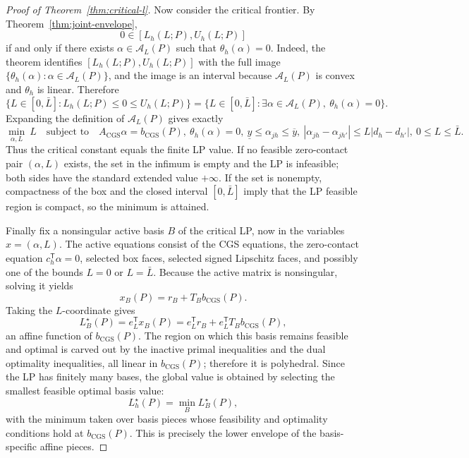 \documentclass[11pt]{article}
\newcommand{\transpose}{\mathsf{T}}
\theoremstyle{definition}
\theoremstyle{plain}
\theoremstyle{remark}
\begin{document}
\begin{proof}[Proof of Theorem~\ref{thm:critical-l}]
Now consider the critical frontier.  By Theorem~\ref{thm:joint-envelope},
\[
  0\in[L_h(L;P),U_h(L;P)]
\]
if and only if there exists \(\alpha\in\mathcal A_L(P)\) such that
\(\theta_h(\alpha)=0\).  Indeed, the theorem identifies
\([L_h(L;P),U_h(L;P)]\) with the full image
\(\{\theta_h(\alpha):\alpha\in\mathcal A_L(P)\}\), and the image is an
interval because \(\mathcal A_L(P)\) is convex and \(\theta_h\) is linear.
Therefore
\[
  \{L\in[0,\bar L]:L_h(L;P)\le0\le U_h(L;P)\}
  =
  \{L\in[0,\bar L]:\exists\alpha\in\mathcal A_L(P),\
    \theta_h(\alpha)=0\}.
\]
Expanding the definition of \(\mathcal A_L(P)\) gives exactly
\[
 \min_{\alpha,L}\ L
 \quad\text{subject to}\quad
 A_{\mathrm{CGS}}\alpha=b_{\mathrm{CGS}}(P),\ 
 \theta_h(\alpha)=0,\ 
 \underline y\le\alpha_{jh}\le\overline y,\ 
 |\alpha_{j h}-\alpha_{j h'}|\le L|d_h-d_{h'}|,\ 
 0\le L\le\bar L .
\]
Thus the critical constant equals the finite LP value.  If no feasible
zero-contact pair \((\alpha,L)\) exists, the set in the infimum is empty and
the LP is infeasible; both sides have the standard extended value \(+\infty\).
If the set is nonempty, compactness of the box and the closed interval
\([0,\bar L]\) imply that the LP feasible region is compact, so the minimum is
attained.

Finally fix a nonsingular active basis \(B\) of the critical LP, now in the
variables \(x=(\alpha,L)\).  The active equations consist of the CGS equations,
the zero-contact equation \(c_h^\transpose\alpha=0\), selected box faces,
selected signed Lipschitz faces, and possibly one of the bounds \(L=0\) or
\(L=\bar L\).  Because the active matrix is nonsingular, solving it yields
\[
  x_B(P)=r_B+T_B b_{\mathrm{CGS}}(P).
\]
Taking the \(L\)-coordinate gives
\[
  L_B^\star(P)=e_L^\transpose x_B(P)
  =e_L^\transpose r_B+e_L^\transpose T_B b_{\mathrm{CGS}}(P),
\]
an affine function of \(b_{\mathrm{CGS}}(P)\).  The region on which this basis
remains feasible and optimal is carved out by the inactive primal inequalities
and the dual optimality inequalities, all linear in \(b_{\mathrm{CGS}}(P)\);
therefore it is polyhedral.  Since the LP has finitely many bases, the global
value is obtained by selecting the smallest feasible optimal basis value:
\[
  L_h^\star(P)=\min_{B} L_B^\star(P),
\]
with the minimum taken over basis pieces whose feasibility and optimality
conditions hold at \(b_{\mathrm{CGS}}(P)\).  This is precisely the lower
envelope of the basis-specific affine pieces.
\end{proof}
\end{document}

